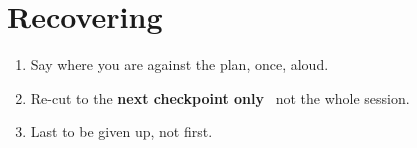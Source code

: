 \section{Recovering}
\begin{enumerate}[nosep]
  \item Say where you are against the plan, once, aloud.
  \item Re-cut to the \textbf{next checkpoint only} \dash\ not the whole session.
  \item {} Last to be given up, not first.
\end{enumerate}


